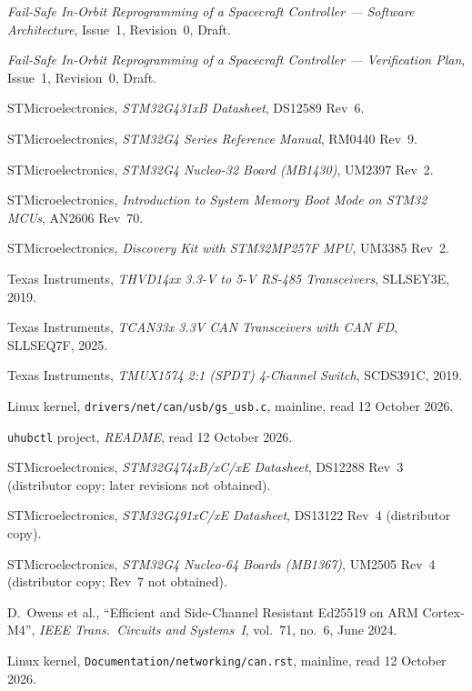 \documentclass[11pt,a4paper]{article}
\begin{document}
\noindent [2] \emph{Fail-Safe In-Orbit Reprogramming of a Spacecraft
Controller --- Software Architecture}, Issue~1, Revision~0, Draft.

\noindent [3] \emph{Fail-Safe In-Orbit Reprogramming of a Spacecraft
Controller --- Verification Plan}, Issue~1, Revision~0, Draft.

\noindent [4] STMicroelectronics, \emph{STM32G431xB Datasheet}, DS12589 Rev~6.

\noindent [5] STMicroelectronics, \emph{STM32G4 Series Reference Manual},
RM0440 Rev~9.

\noindent [6] STMicroelectronics, \emph{STM32G4 Nucleo-32 Board (MB1430)},
UM2397 Rev~2.

\noindent [7] STMicroelectronics, \emph{Introduction to System Memory Boot
Mode on STM32 MCUs}, AN2606 Rev~70.

\noindent [8] STMicroelectronics, \emph{Discovery Kit with STM32MP257F MPU},
UM3385 Rev~2.

\noindent [9] Texas Instruments, \emph{THVD14xx 3.3-V to 5-V RS-485
Transceivers}, SLLSEY3E, 2019.

\noindent [10] Texas Instruments, \emph{TCAN33x 3.3V CAN Transceivers with CAN
FD}, SLLSEQ7F, 2025.

\noindent [11] Texas Instruments, \emph{TMUX1574 2:1 (SPDT) 4-Channel Switch},
SCDS391C, 2019.

\noindent [12] Linux kernel, \texttt{drivers/net/can/usb/gs\_usb.c}, mainline,
read 12 October 2026.

\noindent [13] \texttt{uhubctl} project, \emph{README}, read 12 October 2026.

\noindent [14] STMicroelectronics, \emph{STM32G474xB/xC/xE Datasheet}, DS12288
Rev~3 (distributor copy; later revisions not obtained).

\noindent [15] STMicroelectronics, \emph{STM32G491xC/xE Datasheet}, DS13122
Rev~4 (distributor copy).

\noindent [16] STMicroelectronics, \emph{STM32G4 Nucleo-64 Boards (MB1367)},
UM2505 Rev~4 (distributor copy; Rev~7 not obtained).

\noindent [17] D.~Owens et al., ``Efficient and Side-Channel Resistant Ed25519
on ARM Cortex-M4'', \emph{IEEE Trans.\ Circuits and Systems~I}, vol.~71,
no.~6, June 2024.

\noindent [18] Linux kernel, \texttt{Documentation/networking/can.rst},
mainline, read 12 October 2026.

\end{document}
